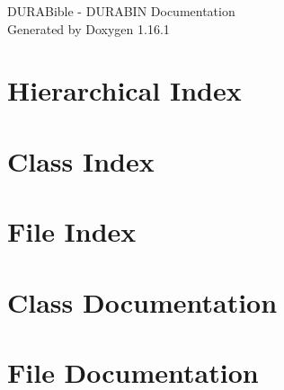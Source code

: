 \documentclass[twoside]{book}
\newcommand{\+}{\discretionary{\mbox{\scriptsize$\hookleftarrow$}}{}{}}
\newcommand{\clearemptydoublepage}{%
    \newpage{\pagestyle{empty}\cleardoublepage}%
  }
\begin{document}
  \raggedbottom
    \hypersetup{pageanchor=false,
                bookmarksnumbered=true,
                pdfencoding=unicode
               }
  \begin{titlepage}
  \vspace*{7cm}
  \begin{center}%
  {\Large DURABible -\/ DURABIN Documentation}\\
  \vspace*{1cm}
  {\large Generated by Doxygen 1.16.1}\\
  \end{center}
  \end{titlepage}
  \clearemptydoublepage
  \tableofcontents
  \clearemptydoublepage
  \hypersetup{pageanchor=true}

\chapter{Hierarchical Index}

\chapter{Class Index}

\chapter{File Index}

\chapter{Class Documentation}


















\chapter{File Documentation}






  \backmatter
  \newpage
  \clearemptydoublepage
  \printindex
\end{document}
